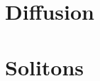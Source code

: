 \documentclass[
	a4paper, %
	10pt, %
]{CSUniSchoolLabReport}
\begin{document}
\section{Diffusion}










\section{Solitons}
\end{document}
